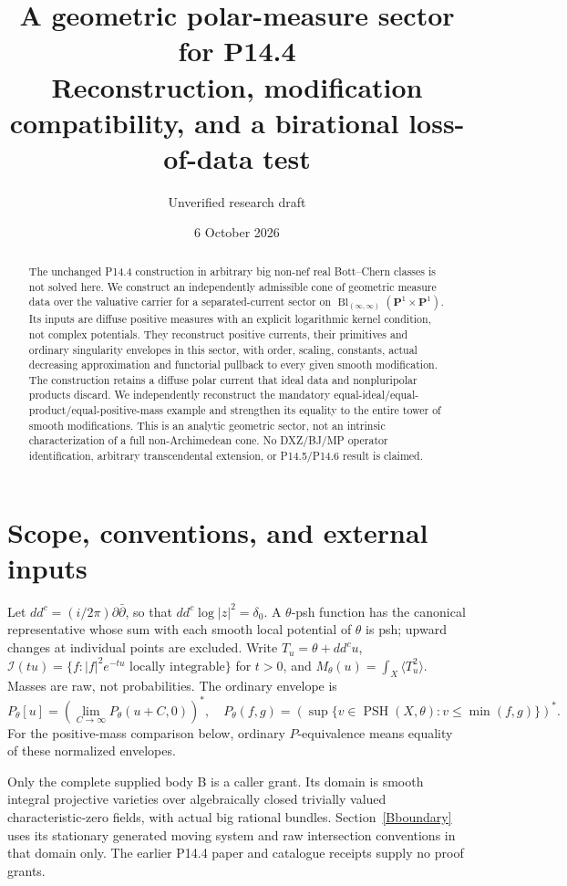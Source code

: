 \documentclass[11pt]{article}
\title{A geometric polar-measure sector for P14.4\\
\large Reconstruction, modification compatibility, and a birational loss-of-data test}
\author{Unverified research draft}
\date{6 October 2026}
\theoremstyle{remark}\newtheorem{remark}[theorem]{Remark}
\newcommand{\ddc}{dd^c}
\newcommand{\PSH}{\operatorname{PSH}}
\newcommand{\cI}{\mathcal I}
\newcommand{\PP}{\mathbf P^1}
\begin{document}
\maketitle
\begin{abstract}
The unchanged P14.4 construction in arbitrary big non-nef real
Bott--Chern classes is not solved here. We construct an independently
admissible cone of geometric measure data over the valuative carrier
for a separated-current sector on
$\operatorname{Bl}_{(\infty,\infty)}(\PP\times\PP)$.
Its inputs are diffuse positive measures with an explicit logarithmic
kernel condition, not complex potentials. They reconstruct positive
currents, their primitives and ordinary singularity envelopes in this
sector, with order, scaling, constants, actual decreasing approximation
and functorial pullback to every given smooth modification.
The construction retains a diffuse polar current that ideal data and
nonpluripolar products discard. We independently reconstruct the
mandatory equal-ideal/equal-product/equal-positive-mass example and
strengthen its equality to the entire tower of smooth modifications.
This is an analytic geometric sector, not an intrinsic characterization
of a full non-Archimedean cone. No DXZ/BJ/MP operator identification,
arbitrary transcendental extension, or P14.5/P14.6 result is claimed.
\end{abstract}

\section{Scope, conventions, and external inputs}
Let $\ddc=(i/2\pi)\partial\bar\partial$, so that
$\ddc\log|z|^2=\delta_0$. A $\theta$-psh function has the canonical
representative whose sum with each smooth local potential of $\theta$
is psh; upward changes at individual points are excluded. Write
$T_u=\theta+\ddc u$,
$\cI(tu)=\{f:|f|^2e^{-tu}\text{ locally integrable}\}$ for $t>0$,
and $M_\theta(u)=\int_X\langle T_u^2\rangle$.
Masses are raw, not probabilities.
The ordinary envelope is
\[
 P_\theta[u]=\left(\lim_{C\to\infty}P_\theta(u+C,0)\right)^*,
 \quad
 P_\theta(f,g)=
 \left(\sup\{v\in\PSH(X,\theta):v\leq\min(f,g)\}\right)^*.
 \tag{1.1}
\]
For the positive-mass comparison below, ordinary $P$-equivalence
means equality of these normalized envelopes.

Only the complete supplied body B is a caller grant. Its domain is
smooth integral projective varieties over algebraically closed
trivially valued characteristic-zero fields, with actual big rational
bundles. Section~\ref{Bboundary} uses its stationary generated moving
system and raw intersection conventions in that domain only.
The earlier P14.4 paper and catalogue receipts supply no proof grants.
\end{document}
